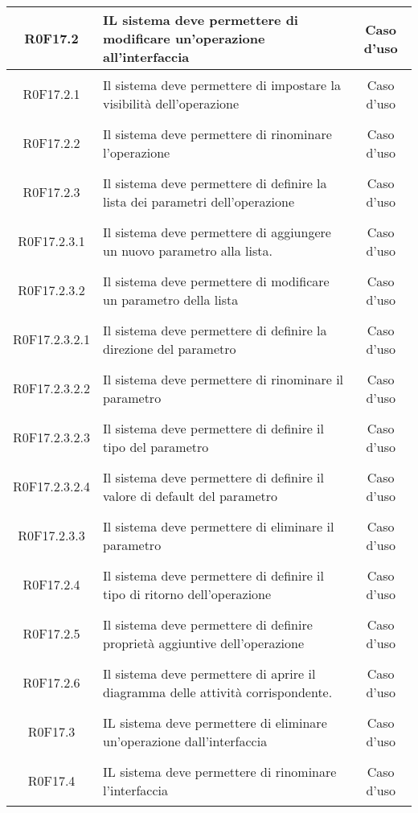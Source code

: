 \documentclass[../AnalisiDeiRequisiti.tex]{subfiles}
\begin{document}
\begin{longtable}{|c|>{\centering}p{7cm}|c|}
	\hypertarget{R0F17.2}{R0F17.2} & IL sistema deve permettere di modificare un'operazione all'interfaccia & Caso d'uso \\ \hline
	\hypertarget{R0F17.2.1}{R0F17.2.1} & Il sistema deve permettere di impostare la visibilità dell'operazione & Caso d'uso \\ \hline
	\hypertarget{R0F17.2.2}{R0F17.2.2} & Il sistema deve permettere di rinominare l'operazione & Caso d'uso \\ \hline
	\hypertarget{R0F17.2.3}{R0F17.2.3} & Il sistema deve permettere di definire la lista dei parametri dell'operazione & Caso d'uso \\ \hline
	\hypertarget{R0F17.2.3.1}{R0F17.2.3.1} & Il sistema deve permettere di aggiungere un nuovo parametro alla lista. & Caso d'uso \\ \hline
	\hypertarget{R0F17.2.3.2}{R0F17.2.3.2} & Il sistema deve permettere di modificare un parametro della lista & Caso d'uso \\ \hline
	\hypertarget{R0F17.2.3.2.1}{R0F17.2.3.2.1} & Il sistema deve permettere di definire la direzione del parametro & Caso d'uso \\ \hline
	\hypertarget{R0F17.2.3.2.2}{R0F17.2.3.2.2} & Il sistema deve permettere di rinominare il parametro & Caso d'uso \\ \hline
	\hypertarget{R0F17.2.3.2.3}{R0F17.2.3.2.3} & Il sistema deve permettere di definire il tipo del parametro & Caso d'uso \\ \hline
	\hypertarget{R0F17.2.3.2.4}{R0F17.2.3.2.4} & Il sistema deve permettere di definire il valore di default del parametro & Caso d'uso \\ \hline
	\hypertarget{R0F17.2.3.3}{R0F17.2.3.3} & Il sistema deve permettere di eliminare il parametro & Caso d'uso \\ \hline
	\hypertarget{R0F17.2.4}{R0F17.2.4} & Il sistema deve permettere di definire il tipo di ritorno dell'operazione & Caso d'uso \\ \hline
	\hypertarget{R0F17.2.5}{R0F17.2.5} & Il sistema deve permettere di definire proprietà aggiuntive dell'operazione & Caso d'uso \\ \hline
	\hypertarget{R0F17.2.6}{R0F17.2.6} & Il sistema deve permettere di aprire il diagramma delle attività corrispondente. & Caso d'uso \\ \hline
	\hypertarget{R0F17.3}{R0F17.3} & IL sistema deve permettere di eliminare un'operazione dall'interfaccia 
	& Caso d'uso \\ \hline
	\hypertarget{R0F17.4}{R0F17.4} & IL sistema deve permettere di rinominare l'interfaccia & Caso d'uso \\ \hline

\end{longtable}
\end{document}
